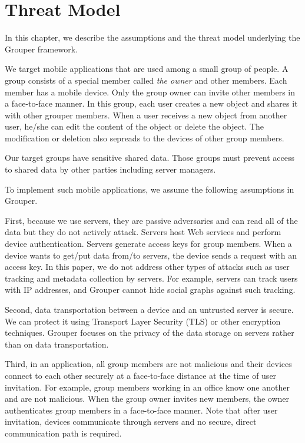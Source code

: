 \documentclass[a4paper,11pt]{report}
\begin{document}
\chapter{Threat Model} \label{chapter:threat_model}

In this chapter, we describe the assumptions and the threat model underlying the Grouper framework.

We target mobile applications that are used among a small group of people.
A group consists of a special member called \emph{the owner} and other members.
Each member has a mobile device.
Only the group owner can invite other members in a face-to-face manner.
In this group, each user creates a new object and shares it with other grouper members.
When a user receives a new object from another user, he/she can edit the content of the object or delete the object.
The modification or deletion also sepreads to the devices of other group members.

Our target groups have sensitive shared data.
Those groups must prevent access to shared data by other parties including server managers.

To implement such mobile applications, we assume the following assumptions in Grouper.

First, because we use servers, they are passive adversaries and can read all of the data but they do not actively attack.
Servers host Web services and perform device authentication.
Servers generate access keys for group members. 
When a device wants to get/put data from/to servers, the device sends a request with an access key.
In this paper, we do not address other types of attacks such as user tracking and metadata collection by servers. 
For example, servers can track users with IP addresses, and Grouper cannot hide social graphs against such tracking.

Second, data transportation between a device and an untrusted server is secure.
We can protect it using Transport Layer Security (TLS) or other encryption techniques.
Grouper focuses on the privacy of the data storage on servers rather than on data transportation.

Third, in an application, all group members are not malicious and their devices connect to each other securely at a face-to-face distance at the time of user invitation.
For example, group members working in an office know one another and are not malicious.
When the group owner invites new members, the owner authenticates group members in a face-to-face manner.
Note that after user invitation, devices communicate through servers and no secure, direct communication path is required.
\end{document}
